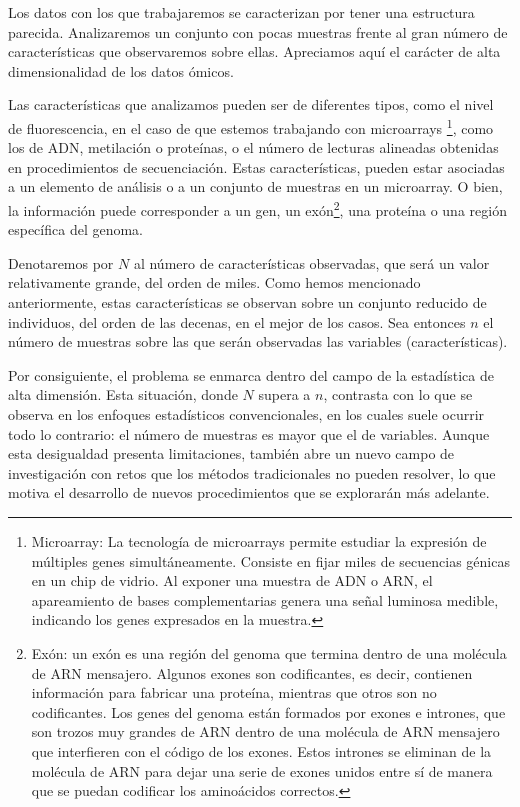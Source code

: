 Los datos con los que trabajaremos se caracterizan por tener una estructura parecida. Analizaremos un
conjunto con pocas muestras frente al gran número de características que observaremos sobre ellas. Apreciamos
aquí el carácter de alta dimensionalidad de los datos ómicos. \newline

Las características que analizamos pueden ser de diferentes tipos, como el nivel de fluorescencia, en el caso
de que estemos trabajando con microarrays \footnote[1]{Microarray: La tecnología de microarrays permite estudiar 
la expresión de múltiples genes simultáneamente. Consiste en fijar miles de secuencias génicas en un chip de vidrio. 
Al exponer una muestra de ADN o ARN, el apareamiento de bases complementarias genera una señal luminosa medible, 
indicando los genes expresados en la muestra\cite{microarray-definition}.}, como los de ADN, metilación o proteínas, o el número de lecturas 
alineadas obtenidas en procedimientos de secuenciación. Estas características, pueden estar asociadas a un
elemento de análisis o a un conjunto de muestras en un microarray. O bien, la información puede corresponder a
un gen, un exón\footnote[2]{Exón: un exón es una región del genoma que termina dentro de una molécula de ARN mensajero.
Algunos exones son codificantes, es decir, contienen información para fabricar una proteína, mientras que otros 
son no codificantes. Los genes del genoma están formados por exones e intrones, que son trozos muy grandes de ARN 
dentro de una molécula de ARN mensajero que interfieren con el código de los exones. 
Estos intrones se eliminan de la molécula de ARN para dejar una serie de exones unidos entre sí de manera que se 
puedan codificar los aminoácidos correctos\cite{exon-definition}\cite{intron-definition}.}, una proteína o una región específica del genoma. \newline

Denotaremos por $N$ al número de características observadas, que será un valor relativamente grande, del orden
de miles. Como hemos mencionado anteriormente, estas características se observan sobre un conjunto reducido de 
individuos, del orden de las decenas, en el mejor de los casos. Sea entonces $n$ el número de muestras sobre
las que serán observadas las variables (características). \newline

Por consiguiente, el problema se enmarca dentro del campo de la estadística de alta dimensión. Esta
situación, donde $N$ supera a $n$, contrasta con lo que se observa en los enfoques estadísticos convencionales,
en los cuales suele ocurrir todo lo contrario: el número de muestras es mayor que el de variables. Aunque esta
desigualdad presenta limitaciones, también abre un nuevo campo de investigación con retos que los métodos 
tradicionales no pueden resolver, lo que motiva el desarrollo de nuevos procedimientos que se explorarán más 
adelante. \newline

